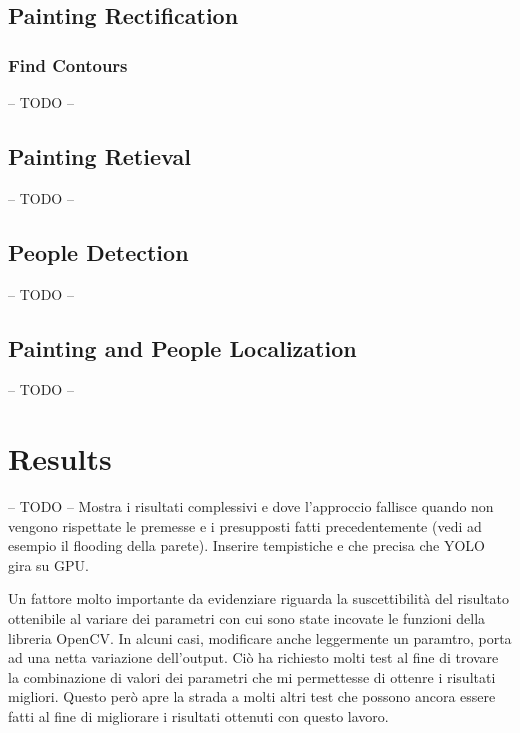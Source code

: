 \documentclass[10pt,twocolumn,letterpaper]{article}
\begin{document}
\subsection{Painting Rectification}

\subsubsection{Find Contours}
-- TODO --
\subsection{Painting Retieval}
-- TODO --
\subsection{People Detection}
-- TODO --
\subsection{Painting and People Localization}
-- TODO --

\section{Results}
-- TODO --
Mostra i risultati complessivi e dove l'approccio fallisce quando non vengono rispettate le premesse e i presupposti fatti precedentemente (vedi ad esempio il flooding della parete).
Inserire tempistiche e che precisa che YOLO gira su GPU.


Un fattore molto importante da evidenziare riguarda la suscettibilità del risultato ottenibile al variare dei parametri con cui sono state incovate le funzioni della libreria OpenCV. In alcuni casi, modificare anche leggermente un paramtro, porta ad una netta variazione dell'output. Ciò ha richiesto molti test al fine di trovare la combinazione di valori dei parametri che mi permettesse di ottenre i risultati migliori. Questo però apre la strada a molti altri test che possono ancora essere fatti al fine di migliorare i risultati ottenuti con questo lavoro.
\end{document}
